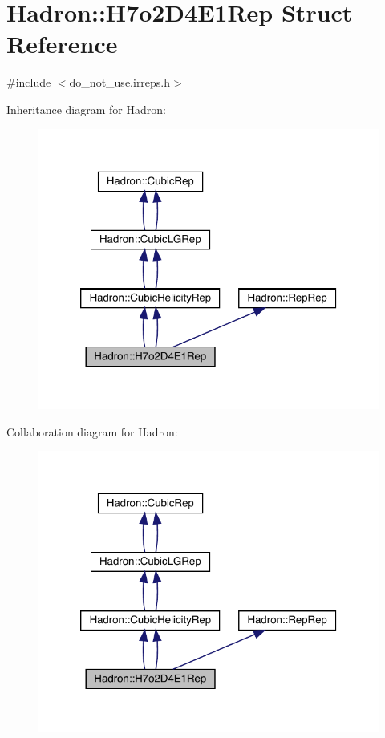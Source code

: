 \hypertarget{structHadron_1_1H7o2D4E1Rep}{}\section{Hadron\+:\+:H7o2\+D4\+E1\+Rep Struct Reference}
\label{structHadron_1_1H7o2D4E1Rep}


{\ttfamily \#include $<$do\+\_\+not\+\_\+use.\+irreps.\+h$>$}



Inheritance diagram for Hadron\+:\nopagebreak
\begin{figure}[H]
\begin{center}
\leavevmode
\includegraphics[width=320pt]{dc/d28/structHadron_1_1H7o2D4E1Rep__inherit__graph}
\end{center}
\end{figure}


Collaboration diagram for Hadron\+:\nopagebreak
\begin{figure}[H]
\begin{center}
\leavevmode
\includegraphics[width=320pt]{d7/d23/structHadron_1_1H7o2D4E1Rep__coll__graph}
\end{center}
\end{figure}

